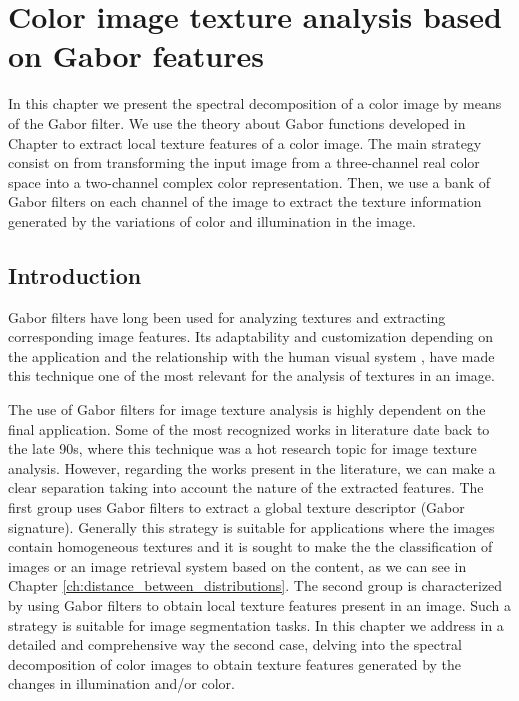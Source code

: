 \chapter{Color image texture analysis based on Gabor features}

In this chapter we present the spectral decomposition of a color image by means of the Gabor filter. We use the theory about Gabor functions developed in Chapter to extract local texture features of a color image. The main strategy consist on from transforming the input image from a three-channel real color space into a two-channel complex color representation. Then, we use a bank of Gabor filters on each channel of the image to extract the texture information generated by the variations of color and illumination in the image.

\section{Introduction}

Gabor filters have long been used for analyzing textures and extracting corresponding image features. Its adaptability and customization depending on the application and the relationship with the human visual system \cite{Daugman:JOSA:1985a}, have made this technique one of the most relevant for the analysis of textures in an image.


The use of Gabor filters for image texture analysis is highly dependent on the final application. Some of the most recognized works in literature date back to the late 90s, where this technique was a hot research topic for image texture analysis. However, regarding the works present in the literature, we can make a clear separation taking into account the nature of the extracted features. The first group uses Gabor filters to extract a global texture descriptor (Gabor signature). Generally this strategy is suitable for applications where the images contain homogeneous textures and it is sought to make the the classification of images or an image retrieval system based on the content, as we can see in Chapter \ref{ch:distance_between_distributions}. The second group is characterized by using Gabor filters to obtain local texture features present in an image. Such a strategy is suitable for image segmentation tasks. In this chapter we address in a detailed and comprehensive way the second case, delving into the spectral decomposition of color images to obtain texture features generated by the changes in illumination and/or color.

